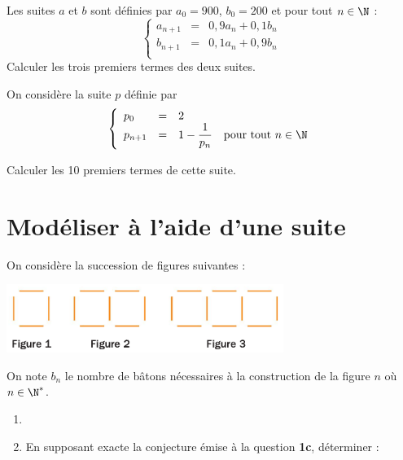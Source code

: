 \documentclass[a4paper,11pt,exos]{nsi} %
\begin{document}
Les suites $a$ et $b$ sont définies par $a_0=900$, $b_0=200$ et pour tout $n\in\N$ :
$$\left\lbrace\begin{array}{llll}
	a_{n+1} & = &0,9a_n+0,1b_n \\
	b_{n+1}& = & 0,1a_n+0,9b_n\\
\end{array}
\right. $$
Calculer les trois premiers termes des deux suites.\\


On considère la suite $p$ définie par 
$$\left\{
\begin{array}{llll}
	p_0 & = & 2 & \\
	p_{n+1} & = & 1-\dfrac{1}{p_n} & \text{pour tout } n\in\N\\
\end{array}
\right. $$

Calculer les 10 premiers termes de cette suite.


\section*{Modéliser à l'aide d'une suite}


\exo{}
On considère la succession de figures suivantes :
\begin{center}
	\includegraphics[width=9cm]{batons}
\end{center}
On note $b_n$ le nombre de bâtons nécessaires à la construction de la figure $n$ où $n\in\N^*$.
\begin{enumerate}
	\item 	{}
	\item 	En supposant exacte la conjecture émise à la question \textbf{1c}, déterminer :
\end{enumerate}
\end{document}
